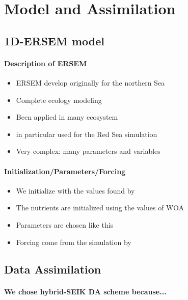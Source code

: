 \section{Model and Assimilation}

\subsection{1D-ERSEM model}

\paragraph{Description of ERSEM}

\begin{itemize}
  \item ERSEM develop originally for the northern Sea
  \item Complete ecology modeling
  \item Been applied in many ecosystem
  \item in particular used for the Red Sea simulation \citet{Triantafyllou2013}
  \item Very complex: many parameters and variables
\end{itemize}

\paragraph{Initialization/Parameters/Forcing}

\begin{itemize}
  \item We initialize with the values found by \citet{Triantafyllou2013}
  \item The nutrients are initialized using the values of WOA
  \item Parameters are chosen like this
  \item Forcing come from the simulation by \citet{Yao2014b, Yao2014}
\end{itemize}

\subsection{Data Assimilation}

\paragraph{We chose hybrid-SEIK DA scheme because...}

